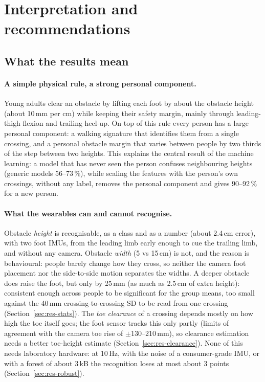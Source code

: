 \section{Interpretation and recommendations}
\label{sec:discussion}

\subsection{What the results mean}

\paragraph{A simple physical rule, a strong personal component.} Young adults clear an obstacle by lifting each foot by about the
obstacle height (about 10\,mm per cm) while keeping their safety margin, mainly through leading-thigh flexion and trailing heel-up.
On top of this rule every person has a large personal component: a walking signature that identifies them from a single crossing,
and a personal obstacle margin that varies between people by two thirds of the step between two heights. This explains the
central result of the machine learning: a model that has never seen the person confuses neighbouring heights (generic models
56--73\,\%), while scaling the features with the person's own crossings, without any label, removes the personal component and
gives 90--92\,\% for a new person.

\paragraph{What the wearables can and cannot recognise.} Obstacle \emph{height} is recognisable, as a class and as a number
(about 2.4\,cm error), with two foot IMUs, from the leading limb early enough to cue the trailing limb, and without any camera.
Obstacle \emph{width} (5 vs 15\,cm) is not, and the reason is behavioural: people barely change how they cross, so neither the
camera foot placement nor the side-to-side motion separates the widths. A deeper obstacle does raise the foot, but only by 25\,mm
(as much as 2.5\,cm of extra height): consistent enough across people to be significant for the group means, too small against the
40\,mm crossing-to-crossing SD to be read from one crossing (Section~\ref{sec:res-stats}). The \emph{toe clearance} of a crossing depends mostly on
how high the toe itself goes; the foot sensor tracks this only partly (limits of agreement with the camera toe rise of
$\pm$130--210\,mm), so clearance estimation needs a better toe-height estimate (Section~\ref{sec:res-clearance}). None of this
needs laboratory hardware: at 10\,Hz, with the noise of a consumer-grade IMU, or with a forest of about 3\,kB the recognition loses
at most about 3 points (Section~\ref{sec:res-robust}).

